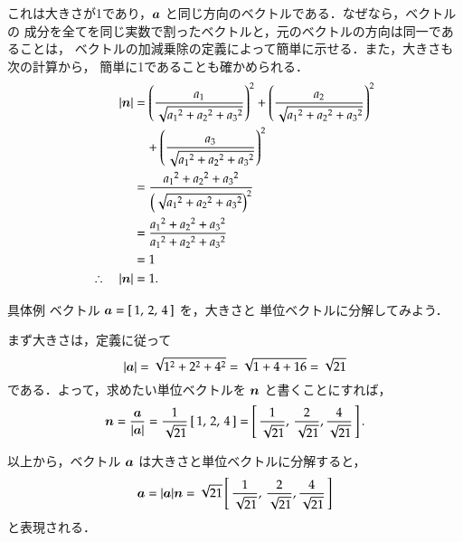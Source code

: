                 これは大きさが1であり，$\boldsymbol{a}$ と同じ方向のベクトルである．なぜなら，ベクトルの
                成分を全てを同じ実数で割ったベクトルと，元のベクトルの方向は同一であることは，
                ベクトルの加減乗除の定義によって簡単に示せる．また，大きさも次の計算から，
                簡単に1であることも確かめられる．
                    \begin{align*}
                        |\boldsymbol{n}| &= \left(\frac{a_{1}}{\sqrt{{a_{1}}^2+{a_{2}}^2+{a_{3}}^2}}\right)^{2} +
                                 \left(\frac{a_{2}}{\sqrt{{a_{1}}^2+{a_{2}}^2+{a_{3}}^2}}\right)^{2} \\
                              &\quad + \left(\frac{a_{3}}{\sqrt{{a_{1}}^2+{a_{2}}^2+{a_{3}}^2}}\right)^{2} \\
                              &= \frac{{a_{1}}^{2}+{a_{2}}^{2}+{a_{3}}^{2}}{\left(\sqrt{{a_{1}}^2+{a_{2}}^2+{a_{3}}^2}\right)^{2}} \\
                              &= \frac{{a_{1}}^{2}+{a_{2}}^{2}+{a_{3}}^{2}}{{a_{1}}^2+{a_{2}}^2+{a_{3}}^{2}} \\
                              &= 1 \\
                        \therefore\quad
                        |\boldsymbol{n}| &= 1.
                    \end{align*}

                \begin{memo}{具体例}
                    ベクトル $\boldsymbol{a}=\left[\,1,\,2,\,4\,\right]$ を，大きさと
                    単位ベクトルに分解してみよう．

                    まず大きさは，定義に従って
                        \begin{equation*}
                            |\boldsymbol{a}| = \sqrt{1^{2}+2^{2}+4^{2}} = \sqrt{1+4+16} = \sqrt{21}
                        \end{equation*}
                    である．よって，求めたい単位ベクトルを $\boldsymbol{n}$ と書くことにすれば，
                        \begin{equation*}
                            \boldsymbol{n} = \frac{\boldsymbol{a}}{|\boldsymbol{a}|} = \frac{1}{\sqrt{21}}\left[\,1,\,2,\,4\,\right]
                                = \left[
                                    \,\frac{1}{\sqrt{21}},\,\frac{2}{\sqrt{21}},\frac{4}{\sqrt{21}}\,
                                  \right].
                        \end{equation*}

                    以上から，ベクトル $\boldsymbol{a}$ は大きさと単位ベクトルに分解すると，
                        \begin{equation*}
                            \boldsymbol{a} = |\boldsymbol{a}|\boldsymbol{n} = \sqrt{21}
                                  \left[
                                    \,\frac{1}{\sqrt{21}},\,\frac{2}{\sqrt{21}},\frac{4}{\sqrt{21}}\,
                                  \right]
                        \end{equation*}
                    と表現される．
                \end{memo}

